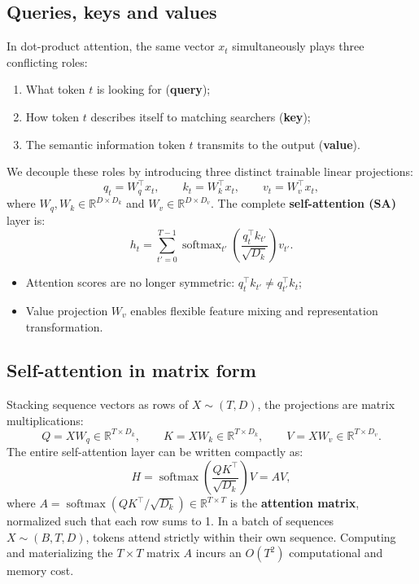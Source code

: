 \documentclass[11pt,a4paper]{article}
\newcommand{\R}{\mathbb{R}}
\DeclareMathOperator{\softmax}{softmax}
\newcommand{\slides}[1]{\par\nopagebreak\noindent{\normalfont\small\emph{(slides #1)}}\par\nopagebreak\vspace{2pt}}
\theoremstyle{definition}
\theoremstyle{plain}
\begin{document}
\subsection{Queries, keys and values}\slides{29 / 84}
In dot-product attention, the same vector $x_t$ simultaneously plays three conflicting roles:
\begin{enumerate}[nosep]
\item What token $t$ is looking for (\textbf{query});
\item How token $t$ describes itself to matching searchers (\textbf{key});
\item The semantic information token $t$ transmits to the output (\textbf{value}).
\end{enumerate}
We decouple these roles by introducing three distinct trainable linear projections:
\begin{equation}
q_t = W_q^\top x_t, \qquad k_t = W_k^\top x_t, \qquad v_t = W_v^\top x_t,
\end{equation}
where $W_q, W_k \in \R^{D \times D_k}$ and $W_v \in \R^{D \times D_v}$. The complete \textbf{self-attention (SA)} layer is:
\begin{equation}\label{eq:sa_vector}
h_t = \sum_{t'=0}^{T-1} \softmax_{t'} \left( \frac{q_t^\top k_{t'}}{\sqrt{D_k}} \right) v_{t'}.
\end{equation}
\begin{itemize}[nosep]
\item Attention scores are no longer symmetric: $q_t^\top k_{t'} \ne q_{t'}^\top k_t$;
\item Value projection $W_v$ enables flexible feature mixing and representation transformation.
\end{itemize}

\subsection{Self-attention in matrix form}\slides{30 / 84}
Stacking sequence vectors as rows of $X \sim (T, D)$, the projections are matrix multiplications:
\begin{equation}
Q = X W_q \in \R^{T \times D_k}, \qquad K = X W_k \in \R^{T \times D_k}, \qquad V = X W_v \in \R^{T \times D_v}.
\end{equation}
The entire self-attention layer can be written compactly as:
\begin{equation}\label{eq:sa_matrix}
H = \softmax \left( \frac{Q K^\top}{\sqrt{D_k}} \right) V = A V,
\end{equation}
where $A = \softmax(Q K^\top / \sqrt{D_k}) \in \R^{T \times T}$ is the \textbf{attention matrix}, normalized such that each row sums to 1. In a batch of sequences $X \sim (B, T, D)$, tokens attend strictly within their own sequence. Computing and materializing the $T \times T$ matrix $A$ incurs an $O(T^2)$ computational and memory cost.
\end{document}
